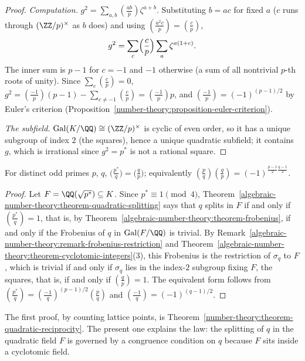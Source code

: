 \begin{proof}
\emph{Computation.} $g^2 = \sum_{a,b}(\frac{ab}{p})\zeta^{a+b}$. Substituting $b = ac$ for fixed $a$ ($c$ runs through $(\ZZ/p)^\times$ as $b$ does) and using $(\frac{a^2c}{p}) = (\frac cp)$,
\[
g^2 = \sum_c\Bigl(\frac cp\Bigr)\sum_a\zeta^{a(1 + c)}.
\]
The inner sum is $p - 1$ for $c = -1$ and $-1$ otherwise (a sum of all nontrivial $p$-th roots of unity). Since $\sum_c(\frac cp) = 0$, $g^2 = (\frac{-1}{p})(p - 1) - \sum_{c \neq -1}(\frac cp) = (\frac{-1}{p})p$,
and $(\frac{-1}{p}) = (-1)^{(p-1)/2}$ by Euler's criterion (Proposition~\ref{number-theory:proposition-euler-criterion}).

\emph{The subfield.} $\mathrm{Gal}(K/\QQ) \cong (\ZZ/p)^\times$ is cyclic of even order, so it has a unique subgroup of index $2$ (the squares), hence a unique quadratic subfield; it contains $g$, which is
irrational since $g^2 = p^*$ is not a rational square.
\end{proof}

\begin{theorem}\label{algebraic-number-theory:theorem-reciprocity-cyclotomic}
For distinct odd primes $p$, $q$, $\bigl(\frac{p^*}{q}\bigr) = \bigl(\frac qp\bigr)$; equivalently $(\frac pq)(\frac qp) = (-1)^{\frac{p-1}2\frac{q-1}2}$.
\end{theorem}

\begin{proof}
Let $F = \QQ(\sqrt{p^*}) \subseteq K$. Since $p^* \equiv 1 \pmod 4$, Theorem~\ref{algebraic-number-theory:theorem-quadratic-splitting} says that $q$ splits in $F$ if and only if $(\frac{p^*}{q}) = 1$, that is, by
Theorem~\ref{algebraic-number-theory:theorem-frobenius}, if and only if the Frobenius of $q$ in $\mathrm{Gal}(F/\QQ)$ is trivial. By Remark~\ref{algebraic-number-theory:remark-frobenius-restriction} and
Theorem~\ref{algebraic-number-theory:theorem-cyclotomic-integers}(3), this Frobenius is the restriction of $\sigma_q$ to $F$, which is trivial if and only if $\sigma_q$ lies in the index-$2$ subgroup fixing $F$,
the squares, that is, if and only if $(\frac qp) = 1$. The equivalent form follows from $(\frac{p^*}{q}) = (\frac{-1}{q})^{(p-1)/2}(\frac pq)$ and $(\frac{-1}{q}) = (-1)^{(q-1)/2}$.
\end{proof}

The first proof, by counting lattice points, is Theorem~\ref{number-theory:theorem-quadratic-reciprocity}. The present one explains the law: the splitting of $q$ in the quadratic field $F$ is governed by a
congruence condition on $q$ because $F$ sits inside a cyclotomic field.

